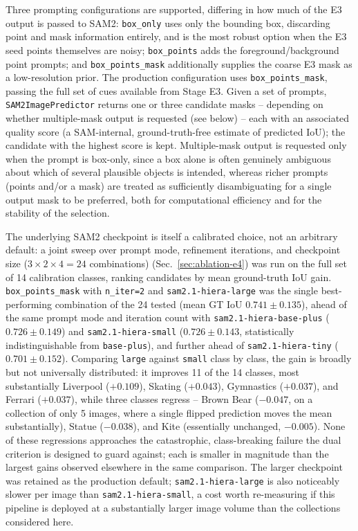 Three prompting configurations are supported, differing in how much of the E3 output is passed to SAM2: \texttt{box\_only} uses only the bounding box, discarding point and mask information entirely, and is the most robust option when the E3 seed points themselves are noisy; \texttt{box\_points} adds the foreground/background point prompts; and \texttt{box\_points\_mask} additionally supplies the coarse E3 mask as a low-resolution prior. The production configuration uses \texttt{box\_points\_mask}, passing the full set of cues available from Stage E3. Given a set of prompts, \texttt{SAM2ImagePredictor} returns one or three candidate masks -- depending on whether multiple-mask output is requested (see below) -- each with an associated quality score (a SAM-internal, ground-truth-free estimate of predicted IoU); the candidate with the highest score is kept. Multiple-mask output is requested only when the prompt is box-only, since a box alone is often genuinely ambiguous about which of several plausible objects is intended, whereas richer prompts (points and/or a mask) are treated as sufficiently disambiguating for a single output mask to be preferred, both for computational efficiency and for the stability of the selection.

The underlying SAM2 checkpoint is itself a calibrated choice, not an arbitrary default: a joint sweep over prompt mode, refinement iterations, and checkpoint size ($3\times2\times4=24$ combinations) (Sec.~\ref{sec:ablation-e4}) was run on the full set of 14 calibration classes, ranking candidates by mean ground-truth IoU gain. \texttt{box\_points\_mask} with \texttt{n\_iter=2} and \texttt{sam2.1-hiera-large} was the single best-performing combination of the 24 tested (mean GT IoU $0.741\pm0.135$), ahead of the same prompt mode and iteration count with \texttt{sam2.1-hiera-base-plus} ($0.726\pm0.149$) and \texttt{sam2.1-hiera-small} ($0.726\pm0.143$, statistically indistinguishable from \texttt{base-plus}), and further ahead of \texttt{sam2.1-hiera-tiny} ($0.701\pm0.152$). Comparing \texttt{large} against \texttt{small} class by class, the gain is broadly but not universally distributed: it improves 11 of the 14 classes, most substantially Liverpool ($+0.109$), Skating ($+0.043$), Gymnastics ($+0.037$), and Ferrari ($+0.037$), while three classes regress -- Brown Bear ($-0.047$, on a collection of only 5 images, where a single flipped prediction moves the mean substantially), Statue ($-0.038$), and Kite (essentially unchanged, $-0.005$). None of these regressions approaches the catastrophic, class-breaking failure the dual criterion is designed to guard against; each is smaller in magnitude than the largest gains observed elsewhere in the same comparison. The larger checkpoint was retained as the production default; \texttt{sam2.1-hiera-large} is also noticeably slower per image than \texttt{sam2.1-hiera-small}, a cost worth re-measuring if this pipeline is deployed at a substantially larger image volume than the collections considered here.

